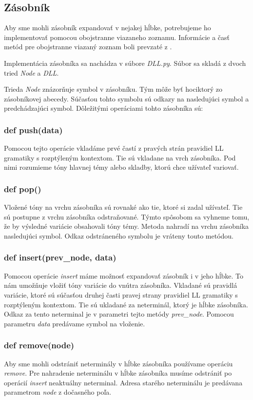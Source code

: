 \subsection{Zásobník}
Aby sme mohli zásobník expandovať v nejakej hĺbke, potrebujeme ho implementovať pomocou obojstranne viazaneho zoznamu. Informácie a časť metód pre obojstranne viazaný zoznam boli prevzaté z \cite{dll:site}.

Implementácia zásobníka sa nachádza v súbore \textit{DLL.py}. Súbor sa skladá z dvoch tried \textit{Node} a \textit{DLL}.

Trieda \textit{Node} znázorňuje symbol v zásobníku. Tým môže byť hociktorý zo zásobníkovej abecedy. Súčasťou tohto symbolu sú odkazy na nasledujúci symbol a predchádzajúci symbol. Dôležitými operáciami tohto zásobníka sú:

\subsubsection*{def push(data)}
Pomocou tejto operácie vkladáme prvé častí z pravých strán pravidiel LL gramatiky s rozptýleným kontextom. Tie sú vkladane na vrch zásobníka. Pod nimi rozumieme tóny hlavnej témy alebo skladby, ktorú chce užívateľ variovať.

\subsubsection*{def pop()}
Vložené tóny na vrchu zásobníka sú rovnaké ako tie, ktoré si zadal užívateľ. Tie sú postupne z vrchu zásobníka odstraňované. Týmto spôsobom sa vyhneme tomu, že by výsledné variácie obsahovali tóny témy. Metoda nahradí na vrchu zásobníka nasledujúci symbol. Odkaz odstráneného symbolu je vráteny touto metódou.

\subsubsection*{def insert(prev\_node, data)}
Pomocou operácie \textit{insert} máme možnosť expandovať zásobník i v jeho hĺbke. To nám umožňuje vložiť tóny variácie do vnútra zásobníka. Vkladané sú pravidlá variácie, ktoré sú súčasťou druhej časti pravej strany pravidiel LL gramatiky s rozptýleným kontextom. Tie sú ukladané za neterminál, ktorý je hĺbke zásobníka. Odkaz za tento neterminal je v parametri tejto metódy \textit{prev\_node}. Pomocou parametru \textit{data} predávame symbol na vloženie.

\subsubsection*{def remove(node)}
Aby sme mohli odstrániť neterminály v hĺbke zásobníka používame operáciu \textit{remove}. Pre nahradenie neterminálu v hĺbke zásobníka musíme odstrániť po operácií \textit{insert} neaktuálny neterminal. Adresa starého neterminálu je predávana parametrom \textit{node} z dočasného poľa.

